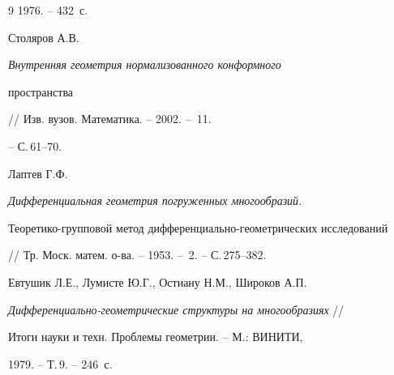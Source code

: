 \begin{thebibliography}{9}
1976. -- 432~с. 




Столяров А.В. {\em Внутренняя геометрия нормализованного конформного 


пространства} // Изв. вузов. Математика. -- 2002. -- \No\,11. 


-- С.\,61--70. 




Лаптев Г.Ф. {\em Дифференциальная геометрия погруженных многообразий. 


Теоретико-групповой метод дифференциально-геометрических исследований}  


// Тр. Моск. матем. о-ва. -- 1953. -- \No\,2. -- С.\,275--382. 




Евтушик Л.Е., Лумисте Ю.Г., Остиану Н.М., Широков А.П. 


{\em Дифференциально-геометрические структуры на многообразиях} // 


Итоги науки и техн. Проблемы геометрии. -- М.: ВИНИТИ, 


1979. -- Т.\,9. -- 246~с. 


 


\end{thebibliography} 


 


\vskip 0.5cm 


 








 


\label{end} 


 


